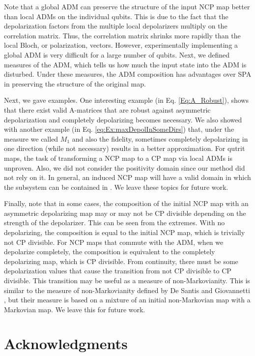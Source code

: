 \documentclass[12pt]{iopart}
\begin{document}
Note that a global ADM can preserve the structure of the input NCP map better than local ADMs on the individual qubits. This is due to the fact that the depolarization factors from the multiple local depolarizers multiply on the correlation matrix. Thus, the correlation matrix shrinks more rapidly than the local Bloch, or polarization, vectors. However, experimentally implementing a global ADM is very difficult for a large number of qubits. Next, we defined measures of the ADM, which tells us how much the input state into the ADM is disturbed. Under these measures, the ADM composition has advantages over SPA in preserving the structure of the original map.

Next, we gave examples. One interesting example (in Eq. \eqref{Eq:A_Robust}), shows that there exist valid A-matrices that are robust against asymmetric depolarization and completely depolarizing becomes  necessary. We also showed with another example (in Eq. \eqref{eq:Ex:maxDepolInSomeDirs}) that, under the measure we called $M_1$ and also the fidelity, sometimes completely depolarizing in one direction (while not necessary) results in a better approximation. For qutrit maps, the task of transforming a NCP map to a CP map via local ADMs is unproven. Also, we did not consider the positivity domain since our method did not rely on it. In general, an induced NCP map will have a valid domain in which the subsystem can be contained in \cite{Rodriguez_Rosario_2008,Dominy_2016,Vacchini_2016}. We leave these topics for future work.

Finally, note that in some cases, the composition of the initial NCP map with an asymmetric depolarizing map may or may not be CP divisible depending on the strength of the depolarizer. This can be seen from the extremes. With no depolarizing, the composition is equal to the initial NCP map, which is trivially not CP divisible. For NCP maps that commute with the ADM, when we depolarize completely, the composition is equivalent to the completely depolarizing map, which is CP divisible. From continuity, there must be some depolarization values that cause the transition from not CP divisible to CP divisible. This transition may be useful as a measure of non-Markovianity. This is similar to the measure of non-Markovianity defined by De Santis and Giovannetti \cite{DeSantis_2021_MeasNonMarkovViaIncoherentMixWithMarkovDynamics}, but their measure is based on a mixture of an initial non-Markovian map with a Markovian map. We leave this for future work.


\section*{Acknowledgments}
\end{document}
